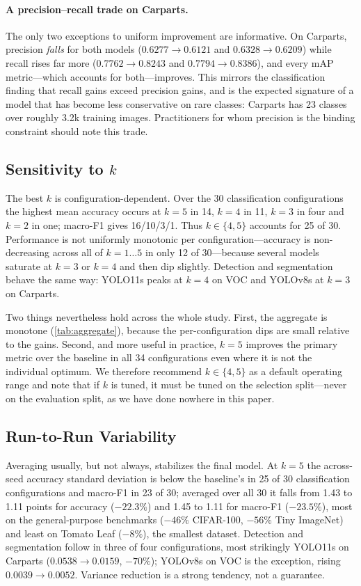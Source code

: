 \paragraph{A precision--recall trade on Carparts.}
The only two exceptions to uniform improvement are informative. On Carparts,
precision \emph{falls} for both models ($0.6277\to0.6121$ and
$0.6328\to0.6209$) while recall rises far more ($0.7762\to0.8243$ and
$0.7794\to0.8386$), and every mAP metric---which accounts for both---improves.
This mirrors the classification finding that recall gains exceed precision
gains, and is the expected signature of a model that has become less
conservative on rare classes: Carparts has 23 classes over roughly 3.2k
training images. Practitioners for whom precision is the binding constraint
should note this trade.

\subsection{Sensitivity to $k$}
\label{sec:sensitivity}

The best $k$ is configuration-dependent. Over the 30 classification
configurations the highest mean accuracy occurs at $k{=}5$ in 14, $k{=}4$ in
11, $k{=}3$ in four and $k{=}2$ in one; macro-F1 gives 16/10/3/1. Thus
$k\in\{4,5\}$ accounts for 25 of 30. Performance is not uniformly monotonic
per configuration---accuracy is non-decreasing across all of $k{=}1\ldots5$ in
only 12 of 30---because several models saturate at $k{=}3$ or $k{=}4$ and then
dip slightly. Detection and segmentation behave the same way: YOLO11s peaks at
$k{=}4$ on VOC and YOLOv8s at $k{=}3$ on Carparts.

Two things nevertheless hold across the whole study. First, the aggregate is
monotone (\cref{tab:aggregate}), because the per-configuration dips are small
relative to the gains. Second, and more useful in practice, $k{=}5$ improves
the primary metric over the baseline in all 34 configurations even where it is
not the individual optimum. We therefore recommend $k\in\{4,5\}$ as a default
operating range and note that if $k$ is tuned, it must be tuned on the
selection split---never on the evaluation split, as we have done nowhere in
this paper.

\subsection{Run-to-Run Variability}

Averaging usually, but not always, stabilizes the final model. At $k{=}5$ the
across-seed accuracy standard deviation is below the baseline's in 25 of 30
classification configurations and macro-F1 in 23 of 30; averaged over all 30 it
falls from 1.43 to 1.11 points for accuracy ($-22.3\%$) and 1.45 to 1.11 for
macro-F1 ($-23.5\%$), most on the general-purpose benchmarks ($-46\%$
CIFAR-100, $-56\%$ Tiny ImageNet) and least on Tomato Leaf ($-8\%$), the
smallest dataset. Detection and segmentation follow in three of four
configurations, most strikingly YOLO11s on Carparts ($0.0538\to0.0159$,
$-70\%$); YOLOv8s on VOC is the exception, rising $0.0039\to0.0052$. Variance
reduction is a strong tendency, not a guarantee.
